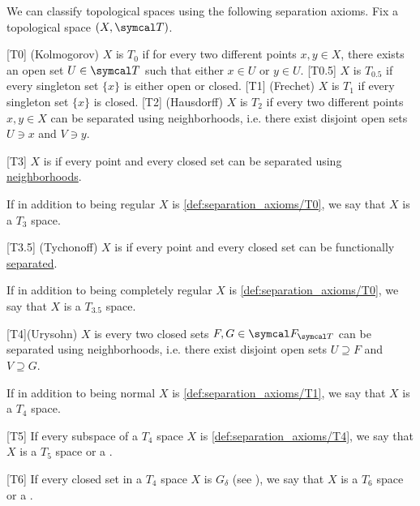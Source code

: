 \begin{definition}\label{def:separation_axioms}
  We can classify topological spaces using the following separation axioms. Fix a topological space \( (X, \Cal{T}) \).

  \begin{description}
    [T0] (Kolmogorov) \( X \) is \( T_0 \) if for every two different points \( x, y \in X \), there exists an open set \( U \in \Cal{T} \) such that either \( x \in U \) or \( y \in U \).
    [T0.5] \( X \) is \( T_{0.5} \) if every singleton set \( \{ x \} \) is either open or closed.
    [T1] (Frechet) \( X \) is \( T_1 \) if every singleton set \( \{ x \} \) is closed.
    [T2] (Hausdorff) \( X \) is \( T_2 \) if every two different points \( x, y \in X \) can be separated using neighborhoods, i.e. there exist disjoint open sets \( U \ni x \) and \( V \ni y \).

    [T3] \( X \) is  if every point and every closed set can be separated using \hyperref[def:topological_space_separation]{neighborhoods}.

    If in addition to being regular \( X \) is \ref{def:separation_axioms/T0}, we say that \( X \) is a \( T_3 \) space.

    [T3.5] (Tychonoff) \( X \) is  if every point and every closed set can be functionally \hyperref[def:topological_space_separation]{separated}.

    If in addition to being completely regular \( X \) is \ref{def:separation_axioms/T0}, we say that \( X \) is a \( T_{3.5} \) space.

    [T4](Urysohn) \( X \) is  every two closed sets \( F, G \in \Cal{F}_{\Cal{T}} \) can be separated using neighborhoods, i.e. there exist disjoint open sets \( U \supseteq F \) and \( V \supseteq G \).

    If in addition to being normal \( X \) is \ref{def:separation_axioms/T1}, we say that \( X \) is a \( T_4 \) space.

    [T5] If every subspace of a \( T_4 \) space \( X \) is \ref{def:separation_axioms/T4}, we say that \( X \) is a \( T_5 \) space or a .

    [T6] If every closed set in a \( T_4 \) space \( X \) is \( G_\delta \) (see ), we say that \( X \) is a \( T_6 \) space or a .
  \end{description}
\end{definition}

